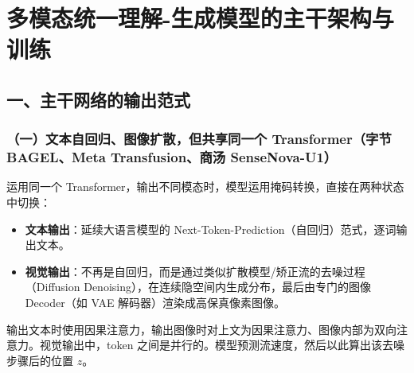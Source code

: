 \setcounter{section}{1}

\hypertarget{ux591aux6a21ux6001ux7edfux4e00ux7406ux89e3-ux751fux6210ux6a21ux578bux7684ux4e3bux5e72ux67b6ux6784ux4e0eux8badux7ec3}{%
\section{多模态统一理解-生成模型的主干架构与训练}\label{ux591aux6a21ux6001ux7edfux4e00ux7406ux89e3-ux751fux6210ux6a21ux578bux7684ux4e3bux5e72ux67b6ux6784ux4e0eux8badux7ec3}}

\hypertarget{ux4e00ux4e3bux5e72ux7f51ux7edcux7684ux8f93ux51faux8303ux5f0f}{%
\subsection{一、主干网络的输出范式}\label{ux4e00ux4e3bux5e72ux7f51ux7edcux7684ux8f93ux51faux8303ux5f0f}}

\hypertarget{ux4e00ux6587ux672cux81eaux56deux5f52ux56feux50cfux6269ux6563ux4f46ux5171ux4eabux540cux4e00ux4e2a-transformerux5b57ux8282-bagelmeta-transfusionux5546ux6c64-sensenova-u1}{%
\subsubsection{（一）文本自回归、图像扩散，但共享同一个 Transformer（字节 BAGEL、Meta Transfusion、商汤 SenseNova-U1）}\label{ux4e00ux6587ux672cux81eaux56deux5f52ux56feux50cfux6269ux6563ux4f46ux5171ux4eabux540cux4e00ux4e2a-transformerux5b57ux8282-bagelmeta-transfusionux5546ux6c64-sensenova-u1}}

运用同一个 Transformer，输出不同模态时，模型运用掩码转换，直接在两种状态中切换：

\begin{itemize}
\tightlist
\item
  \textbf{文本输出}：延续大语言模型的 Next-Token-Prediction（自回归）范式，逐词输出文本。
\item
  \textbf{视觉输出}：不再是自回归，而是通过类似扩散模型/矫正流的去噪过程（Diffusion Denoising），在连续隐空间内生成分布，最后由专门的图像 Decoder（如 VAE 解码器）渲染成高保真像素图像。
\end{itemize}

输出文本时使用因果注意力，输出图像时对上文为因果注意力、图像内部为双向注意力。视觉输出中，token 之间是并行的。模型预测流速度，然后以此算出该去噪步骤后的位置 \(z\)。

